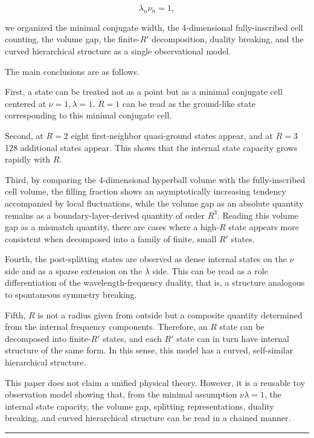 \documentclass[
]{article}
\begin{document}
\[
\lambda_n\nu_n=1,
\]

we organized the minimal conjugate width, the 4-dimensional
fully-inscribed cell counting, the volume gap, the finite-\(R'\)
decomposition, duality breaking, and the curved hierarchical structure
as a single observational model.

The main conclusions are as follows.

First, a state can be treated not as a point but as a minimal conjugate
cell centered at \(\nu=1,\lambda=1\). \(R=1\) can be read as the
ground-like state corresponding to this minimal conjugate cell.

Second, at \(R=2\) eight first-neighbor quasi-ground states appear, and
at \(R=3\) 128 additional states appear. This shows that the internal
state capacity grows rapidly with \(R\).

Third, by comparing the 4-dimensional hyperball volume with the
fully-inscribed cell volume, the filling fraction shows an
asymptotically increasing tendency accompanied by local fluctuations,
while the volume gap as an absolute quantity remains as a
boundary-layer-derived quantity of order \(R^3\). Reading this volume
gap as a mismatch quantity, there are cases where a high-\(R\) state
appears more consistent when decomposed into a family of finite, small
\(R'\) states.

Fourth, the post-splitting states are observed as dense internal states
on the \(\nu\) side and as a sparse extension on the \(\lambda\) side.
This can be read as a role differentiation of the wavelength-frequency
duality, that is, a structure analogous to spontaneous symmetry
breaking.

Fifth, \(R\) is not a radius given from outside but a composite quantity
determined from the internal frequency components. Therefore, an \(R\)
state can be decomposed into finite-\(R'\) states, and each \(R'\) state
can in turn have internal structure of the same form. In this sense,
this model has a curved, self-similar hierarchical structure.

This paper does not claim a unified physical theory. However, it is a
reusable toy observation model showing that, from the minimal assumption
\(\nu\lambda=1\), the internal state capacity, the volume gap, splitting
representations, duality breaking, and curved hierarchical structure can
be read in a chained manner.

\begin{center}\rule{0.5\linewidth}{0.5pt}\end{center}
\end{document}
